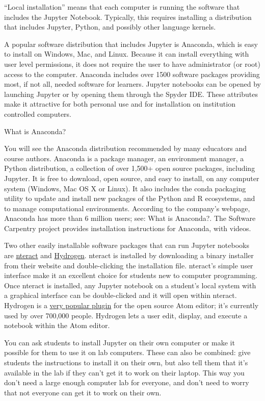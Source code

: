 \documentclass[]{book}
\begin{document}
``Local installation'' means that each computer is running the software
that includes the Jupyter Notebook. Typically, this requires installing
a distribution that includes Jupyter, Python, and possibly other
language kernels.

A popular software distribution that includes Jupyter is Anaconda, which
is easy to install on Windows, Mac, and Linux. Because it can install
everything with user level permissions, it does not require the user to
have administrator (or root) access to the computer. Anaconda includes
over 1500 software packages providing most, if not all, needed software
for learners. Jupyter notebooks can be opened by launching Jupyter or by
opening them through the Spyder IDE. These attributes make it attractive
for both personal use and for installation on institution controlled
computers.

What is Anaconda?

You will see the Anaconda distribution recommended by many educators and
course authors. Anaconda is a package manager, an environment manager, a
Python distribution, a collection of over 1,500+ open source packages,
including Jupyter. It is free to download, open source, and easy to
install, on any computer system (Windows, Mac OS X or Linux). It also
includes the conda packaging utility to update and install new packages
of the Python and R ecosystems, and to manage computational
environments. According to the company's webpage, Anaconda has more than
6 million users; see: What is Anaconda?. The Software Carpentry project
provides installation instructions for Anaconda, with videos.

Two other easily installable software packages that can run Jupyter
notebooks are \href{https://nteract.io/}{nteract} and
\href{https://nteract.io/atom}{Hydrogen}. nteract is installed by
downloading a binary installer from their website and double-clicking
the installation file. nteract's simple user interface make it an
excellent choice for students new to computer programming. Once nteract
is installed, any Jupyter notebook on a student's local system with a
graphical interface can be double-clicked and it will open within
nteract. Hydrogen is a \href{https://atom.io/packages/hydrogen}{very
popular plugin} for the open source Atom editor; it's currently used by
over 700,000 people. Hydrogen lets a user edit, display, and execute a
notebook within the Atom editor.

You can ask students to install Jupyter on their own computer or make it
possible for them to use it on lab computers. These can also be
combined: give students the instructions to install it on their own, but
also tell them that it's available in the lab if they can't get it to
work on their laptop. This way you don't need a large enough computer
lab for everyone, and don't need to worry that not everyone can get it
to work on their own.
\end{document}
